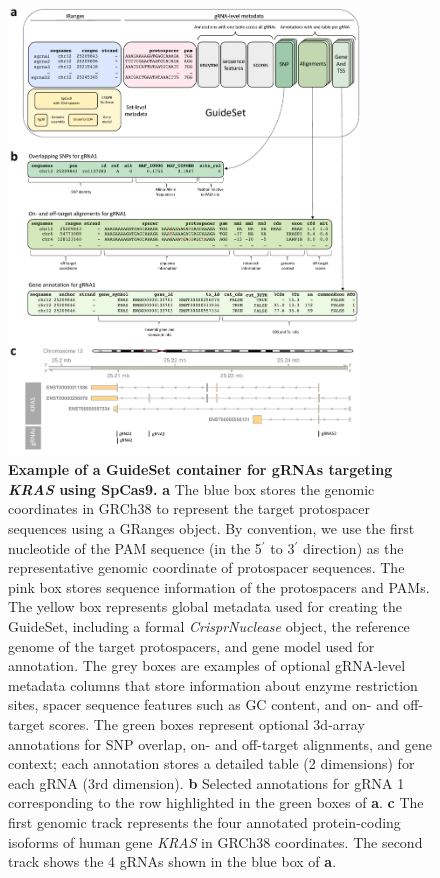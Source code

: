\documentclass[pdftex,english,10pt]{article}
\begin{document}
\begin{figure}
\centering
\includegraphics[width=0.83\textwidth]{figures/guideset/guideset.pdf}
  \caption{\textbf{Example of a GuideSet container for gRNAs targeting \textit{KRAS} using SpCas9.} 
 \textbf{a} The blue box stores the genomic coordinates in GRCh38 to represent the target protospacer sequences using a GRanges object. 
By convention, we use the first nucleotide of the PAM sequence (in the 5$^{\prime}$ to 3$^{\prime}$ direction) as the representative genomic coordinate of protospacer sequences. The pink box stores sequence information of the protospacers and PAMs. The yellow box represents global metadata used for creating the GuideSet, including a formal \textit{CrisprNuclease} object, the reference genome of the target protospacers, and gene model used for annotation. The grey boxes are examples of optional gRNA-level metadata columns that store information about enzyme restriction sites, spacer sequence features such as GC content, and on- and off-target scores. The green boxes represent optional 3d-array annotations for SNP overlap, on- and off-target alignments, and gene context; each annotation stores a detailed table (2 dimensions) for each gRNA (3rd dimension). 
\textbf{b} Selected annotations for gRNA 1 corresponding to the row highlighted in the green boxes of \textbf{a}. 
\textbf{c} The first genomic track represents the four annotated protein-coding isoforms of human gene \textit{KRAS} in GRCh38 coordinates. The second track shows the 4 gRNAs shown in the blue box of \textbf{a}.
}
  \label{fig:guideset}
\end{figure}
\end{document}
